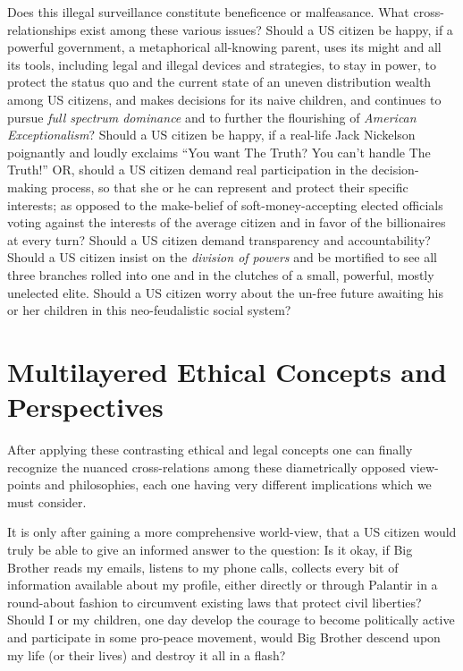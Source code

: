 \documentclass[twoside,twocolumn]{article}
\begin{document}
Does this illegal surveillance constitute beneficence or malfeasance.
What cross-relationships exist among these various issues?
Should a US citizen be happy, if a powerful government, a metaphorical all-knowing parent, uses its might and all its tools,
including legal and illegal devices and strategies, to stay in power, to protect the status quo and the current state of
an uneven distribution wealth among US citizens,
and makes decisions for its naive children,
and continues to pursue
\textit{full spectrum dominance}
and to further the flourishing of 
\textit{American Exceptionalism}?
Should a US citizen be happy, if
a real-life Jack Nickelson poignantly and loudly exclaims
``You want The Truth? You can't handle The Truth!''
OR, should a US citizen demand
real participation in the decision-making process,
so that she or he can represent and protect their specific interests;
as opposed to the make-belief of soft-money-accepting elected officials voting against the interests of the average citizen and in favor of the billionaires at every turn?
Should a US citizen demand transparency and accountability?
Should a US citizen insist on the \textit{division of powers}
and be mortified to see all three branches rolled into one and in the clutches of a small, powerful, mostly unelected elite.
Should a US citizen worry about the un-free future awaiting his or her children in this neo-feudalistic social system?


\section*{Multilayered Ethical Concepts and Perspectives}

After applying these contrasting ethical and legal concepts one can finally recognize the nuanced
cross-relations among these diametrically opposed view-points and philosophies,
each one having very different implications which we must consider.

It is only after gaining a more comprehensive world-view, that a US citizen would truly be able to give an informed answer to the question:
Is it okay, if Big Brother\cite{1984} reads my emails, listens to my phone calls, collects every bit of information available about
my profile, either directly or through Palantir in a round-about fashion to circumvent existing laws that protect civil liberties?
Should I or my children, one day develop the courage to become politically active and participate in some pro-peace movement, would
Big Brother descend upon my life (or their lives) and destroy it all in a flash?
\end{document}
